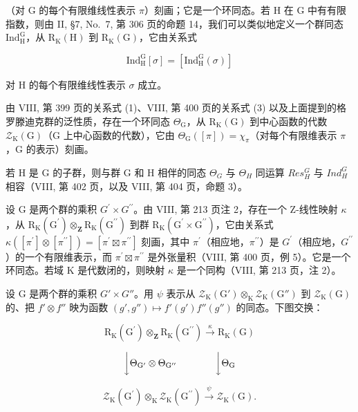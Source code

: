 （对 G 的每个有限维线性表示 \(\pi\)）刻画；它是一个环同态。若 H 在 G 中有有限指数，则由 II, §7, No.~7, 第 306 页的命题 14，我们可以类似地定义一个群同态 \(\mathrm{Ind}_{\mathrm{H}}^{\mathrm{G}}\)，从 \(\mathrm{R}_{\mathrm{K}}(\mathrm{H})\) 到 \(\mathrm{R}_{\mathrm{K}}(\mathrm{G})\)，它由关系式

\[
\mathrm{Ind} _ {\mathrm{H}} ^ {\mathrm{G}} [ \sigma ] = [ \mathrm{Ind} _ {\mathrm{H}} ^ {\mathrm{G}} (\sigma) ]\tag{7}
\]

对 H 的每个有限维线性表示 \(\sigma\) 成立。

由 VIII, 第 399 页的关系式 (1)、VIII, 第 400 页的关系式 (3) 以及上面提到的格罗滕迪克群的泛性质，存在一个环同态 \(\Theta_{\mathrm{G}}\)，从 \(\mathrm{R}_{\mathrm{K}}(\mathrm{G})\) 到中心函数的代数 \(\mathcal{Z}_{\mathrm{K}}(\mathrm{G})\)（\(\mathrm{G}\) 上中心函数的代数），它由 \(\Theta_{\mathrm{G}}([\pi]) = \chi_{\pi}\)（对每个有限维表示 \(\pi\)，\(\mathrm{G}\) 的表示）刻画。

若 H 是 G 的子群，则与群 G 和 H 相伴的同态 \(\Theta_{G}\) 与 \(\Theta_{H}\) 同运算 \(Res_{H}^{G}\) 与 \(Ind_{H}^{G}\) 相容（VIII, 第 402 页，以及 VIII, 第 404 页，命题 3）。

设 G 是两个群的乘积 \(G^{\prime} \times G^{\prime\prime}\)。由 VIII, 第 213 页注 2，存在一个 Z-线性映射 \(\kappa\)，从 \(\mathrm{R}_{\mathrm{K}}(\mathrm{G}^{\prime}) \otimes_{\mathbf{Z}} \mathrm{R}_{\mathrm{K}}(\mathrm{G}^{\prime\prime})\) 到群 \(\mathrm{R}_{\mathrm{K}}(\mathrm{G}^{\prime} \times \mathrm{G}^{\prime\prime})\)，它由关系式 \(\kappa([\pi^{\prime}] \otimes [\pi^{\prime\prime}]) = [\pi^{\prime} \boxtimes \pi^{\prime\prime}]\) 刻画，其中 \(\pi^{\prime}\)（相应地，\(\pi^{\prime\prime}\)）是 \(G^{\prime}\)（相应地，\(G^{\prime\prime}\)）的一个有限维表示，而 \(\pi^{\prime} \boxtimes \pi^{\prime\prime}\) 是外张量积（VIII, 第 400 页，例 5）。它是一个环同态。若域 K 是代数闭的，则映射 \(\kappa\) 是一个同构（VIII, 第 213 页，注 2）。

设 G 是两个群的乘积 \(G' \times G''\)。用 \(\psi\) 表示从 \(\mathcal{Z}_{\mathrm{K}}(\mathrm{G}') \otimes_{\mathrm{K}} \mathcal{Z}_{\mathrm{K}}(\mathrm{G}'' )\) 到 \(\mathcal{Z}_{\mathrm{K}}(\mathrm{G})\) 的、把 \(f' \otimes f''\) 映为函数 \((g', g'') \mapsto f'(g')f''(g'')\) 的同态。下图交换：

\[
\mathrm{R} _ {\mathrm{K}} (\mathrm{G} ^ {\prime}) \otimes_ {\mathbf {Z}} \mathrm{R} _ {\mathrm{K}} (\mathrm{G} ^ {\prime \prime}) \xrightarrow {\kappa} \mathrm{R} _ {\mathrm{K}} (\mathrm{G})
\]

\[
\bigg \downarrow \Theta_ {\mathrm{G} ^ {\prime}} \otimes \Theta_ {\mathrm{G} ^ {\prime \prime}} \qquad \qquad \bigg \downarrow \Theta_ {\mathrm{G}}
\]

\[
\mathcal {Z} _ {\mathrm{K}} (\mathrm{G} ^ {\prime}) \otimes_ {\mathrm{K}} \mathcal {Z} _ {\mathrm{K}} (\mathrm{G} ^ {\prime \prime}) \xrightarrow {\psi} \mathcal {Z} _ {\mathrm{K}} (\mathrm{G}).
\]

